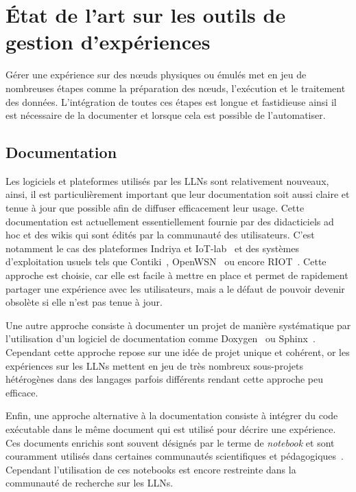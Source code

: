 \section{État de l'art sur les outils de gestion d'expériences}
\label{makesense:related}

Gérer une expérience sur des nœuds physiques ou émulés met en jeu de nombreuses étapes comme la préparation des nœuds, l'exécution et le traitement des données.
L'intégration de toutes ces étapes est longue et fastidieuse ainsi il est nécessaire de la documenter et lorsque cela est possible de l'automatiser. 

\subsection{Documentation}

Les logiciels et plateformes utilisés par les \ac{LLN}s sont relativement nouveaux, ainsi, il est particulièrement important que leur documentation soit aussi claire et tenue à jour que possible afin de diffuser efficacement leur usage.
Cette documentation est actuellement essentiellement fournie par des didacticiels ad hoc et des wikis qui sont édités par la communauté des utilisateurs.
C'est notamment le cas des plateformes Indriya et IoT-lab~\cite{fleury2015fit,doddavenkatappa2011indriya} et des systèmes d'exploitation usuels tels que Contiki~\cite{dunkels2004contiki}, OpenWSN~\cite{watteyne2012openwsn} ou encore RIOT~\cite{baccelli2013riot}.
Cette approche est choisie, car elle est facile à mettre en place et permet de rapidement partager une expérience avec les utilisateurs, mais a le défaut de pouvoir devenir obsolète si elle n'est pas tenue à jour.

Une autre approche consiste à documenter un projet de manière systématique par l'utilisation d'un logiciel de documentation comme Doxygen~\cite{van2004doxygen} ou Sphinx~\cite{brandl2010sphinx}.
Cependant cette approche repose sur une idée de projet unique et cohérent, or les expériences sur les \ac{LLN}s mettent en jeu de très nombreux sous-projets hétérogènes dans des langages parfois différents rendant cette approche peu efficace.

Enfin, une approche alternative à la documentation consiste à intégrer du code exécutable dans le même document qui est utilisé pour décrire une expérience.
Ces documents enrichis sont souvent désignés par le terme de \emph{notebook} et sont couramment utilisés dans certaines communautés scientifiques et pédagogiques~\cite{young2003science,shen2014interactive}.
Cependant l'utilisation de ces notebooks est encore restreinte dans la communauté de recherche sur les \ac{LLN}s.

